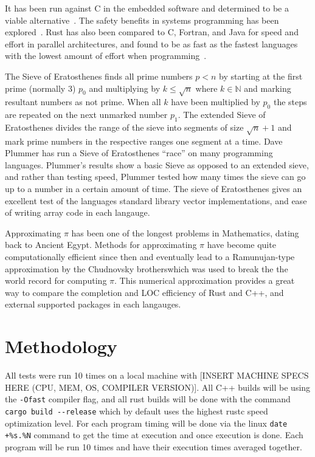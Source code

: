 \documentclass[10pt]{IEEEtran}
\begin{document}
It has been run against C in the embedded software and determined to be a viable alternative~\cite{borgsmuller2021rust}. 
The safety benefits in systems programming has been explored~\cite{BalasubramanianProceedings}. 
Rust has also been compared to C, Fortran, and Java for speed and effort in parallel architectures, 
and found to be as fast as the fastest languages with the lowest amount of effort when programming~\cite{costanzo2021performance}\cite{heyman2020comparison}.
\par
The Sieve of Eratosthenes finds all prime numbers $p<n$ by starting at the first prime (normally 3) $p_0$ and multiplying by $k \leq \sqrt{n}$ where $k \in \mathbb{N}$ and marking resultant numbers as not prime.
When all $k$ have been multiplied by $p_0$ the steps are repeated on the next unmarked number $p_1$.
The extended Sieve of Eratosthenes divides the range of the sieve into segments of size $\sqrt{n}+1$ and mark prime numbers in the respective ranges one segment at a time.
Dave Plummer has run a Sieve of Eratosthenes “race” on many programming languages\cite{plummer}. 
Plummer's results show a basic Sieve as opposed to an extended sieve, and rather than testing speed, Plummer tested how many times 
the sieve can go up to a number in a certain amount of time. 
The sieve of Eratosthenes gives an excellent test of the languages standard library vector implementations, and ease of writing array code in each langauge.
\par
Approximating $\pi$ has been one of the longest problems in Mathematics, dating back to Ancient Egypt\cite{burton}. Methods for approximating $\pi$ have become quite computationally efficient since then and eventually 
lead to a Ramunujan-type approximation by the Chudnovsky brotherswhich was used to break the the world record for computing $\pi$\cite{lynn}.
This numerical approximation provides a great way to compare the completion and LOC efficiency of Rust and C++, and external supported packages in each langauges.

\section{Methodology}
All tests were run 10 times on a local machine with [INSERT MACHINE SPECS HERE (CPU, MEM, OS, COMPILER VERSION)]. All C++ builds will be using the \verb|-Ofast| 
compiler flag, and all rust builds will be done with the command \verb|cargo build --release| which by default 
uses the highest rustc speed optimization level\cite{cargobook}. For each program timing will be done via the linux \verb|date +%s.%N| command to get the time at execution and once execution is done.
Each program will be run 10 times and have their execution times averaged together.
\end{document}
